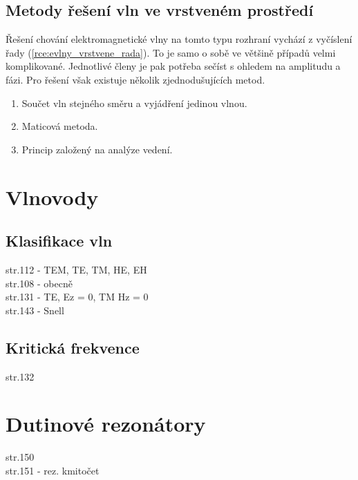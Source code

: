 \subsection{Metody řešení vln ve vrstveném prostředí}
Řešení chování elektromagnetické vlny na tomto typu rozhraní vychází z vyčíslení řady (\ref{rce:evlny_vrstvene_rada}). To je samo o sobě ve většině případů velmi komplikované. Jednotlivé členy je pak potřeba sečíst s ohledem na amplitudu a fázi. Pro řešení však existuje několik zjednodušujících metod.
\begin{enumerate}
\item Součet vln stejného směru a vyjádření jedinou vlnou.
\item Maticová metoda.
\item Princip založený na analýze vedení.
\end{enumerate}
\newpage

\section{Vlnovody}
\subsection{Klasifikace vln}
str.112 - TEM, TE, TM, HE, EH\\
str.108 - obecně\\
str.131 - TE, Ez = 0, TM Hz = 0\\
str.143 - Snell\\
\subsection{Kritická frekvence}
str.132
\newpage

\section{Dutinové rezonátory}
str.150\\
str.151 - rez. kmitočet\\
\newpage